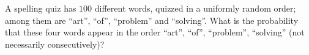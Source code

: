A spelling quiz has $100$ different words, quizzed in a uniformly random order; among them are ``art'', ``of'', ``problem'' and ``solving''. What is the probability that these four words appear in the order ``art'', ``of'', ``problem'', ``solving'' (not necessarily consecutively)?
